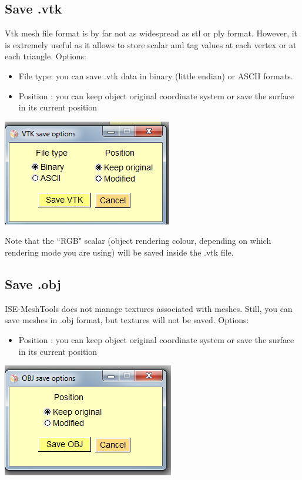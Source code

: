\subsection{Save .vtk}
\begin{minipage}{0.5\textwidth}
Vtk mesh file format is by far not as widespread as stl or ply
format. However, it is extremely useful as it allows to store
scalar and tag values at each vertex or at each triangle.
Options:
\begin{itemize}
\item File type: you can save .vtk data in binary (little endian) or
ASCII formats.

\item Position : you can keep object original coordinate system
or save the surface in its current position
\end{itemize}
\end{minipage}    
\begin{minipage}{0.5\textwidth}\centering
  \includegraphics[scale=0.5]{images/File/Save_vtk.png}
 \end{minipage} 
\noindent
Note that the ``RGB" scalar (object rendering colour, depending on which rendering mode you are
using) will be saved inside the .vtk file.
\subsection{Save .obj}

\begin{minipage}{0.5\textwidth}
ISE-MeshTools does not manage textures associated with
meshes. Still, you can save meshes in .obj format, but
textures will not be saved.
Options:
\begin{itemize}
\item Position : you can keep object original coordinate system
or save the surface in its current position
\end{itemize}
\end{minipage}    
\begin{minipage}{0.5\textwidth}\centering
  \includegraphics[scale=0.5]{images/File/Save_obj.png}
 \end{minipage} 


